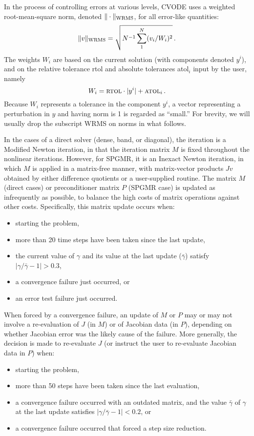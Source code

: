 In the process of controlling errors at various levels, CVODE uses a
weighted root-mean-square norm, denoted 
$\|\cdot\|_{\mbox{\scriptsize WRMS}}$, for all 
error-like quantities:
\begin{equation}\label{wrmsnorm}
 \|v\|_{\mbox{\scriptsize WRMS}} = \sqrt{N^{-1}\sum_1^N (v_i/W_i)^2}
 \, .
\end{equation}
The weights $W_i$ are based on the current solution (with components
denoted $y^i$), and on the relative tolerance {\sc rtol} and absolute
tolerances {\sc atol}$_i$ input by the user, namely
\begin{equation}\label{errwt}
 W_i = \mbox{\sc rtol} \cdot |y^i| + \mbox{\sc atol}_i \, .
\end{equation}
Because $W_i$ represents a tolerance in the component $y^i$, a vector
representing a perturbation in $y$ and having norm is 1 is regarded as
``small.''  For brevity, we will usually drop the subscript WRMS on
norms in what follows.

In the cases of a direct solver (dense, band, or diagonal), the
iteration is a Modified Newton iteration, in that the iteration matrix
$M$ is fixed throughout the nonlinear iterations.  However, for SPGMR,
it is an Inexact Newton iteration, in which $M$ is applied in a
matrix-free manner, with matrix-vector products $Jv$ obtained by
either difference quotients or a user-supplied routine.  The matrix
$M$ (direct cases) or preconditioner matrix $P$ (SPGMR case) is
updated as infrequently as possible, to balance the high costs of
matrix operations against other costs.  Specifically, this matrix
update occurs when:
\begin{itemize}
\item starting the problem,
\item more than 20 time steps have been taken since the last update,
\item the current value of $\gamma$ and its value at the last update
($\bar{\gamma}$) satisfy $|\gamma/\bar{\gamma} - 1| > 0.3$,
\item a convergence failure just occurred, or
\item an error test failure just occurred.
\end{itemize}
When forced by a convergence failure, an update of $M$ or $P$ may or
may not involve a re-evaluation of $J$ (in $M$) or of Jacobian data
(in $P$), depending on whether Jacobian error was the likely cause of
the failure.  More generally, the decision is made to re-evaluate $J$
(or instruct the user to re-evaluate Jacobian data in $P$) when:
\begin{itemize}
\item starting the problem,
\item more than 50 steps have been taken since the last evaluation,
\item a convergence failure occurred with an outdated matrix, and
the value $\bar{\gamma}$ of $\gamma$ at the last update
satisfies $|\gamma/\bar{\gamma} - 1| < 0.2$, or
\item a convergence failure occurred that forced a step size reduction.
\end{itemize}

